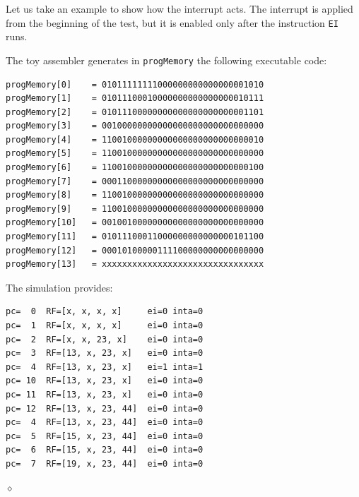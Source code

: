 \begin{exemplu}
Let us take an example to show how the interrupt acts. The interrupt is applied from the beginning of the test, but it is enabled only after the instruction {\tt EI} runs.
{\em 
{}
}

The toy assembler generates in {\tt progMemory} the following executable code:

{\small
\begin{verbatim}
progMemory[0]    = 01011111111000000000000000001010
progMemory[1]    = 01011100010000000000000000010111
progMemory[2]    = 01011100000000000000000000001101
progMemory[3]    = 00100000000000000000000000000000
progMemory[4]    = 11001000000000000000000000000010
progMemory[5]    = 11001000000000000000000000000000
progMemory[6]    = 11001000000000000000000000000100
progMemory[7]    = 00011000000000000000000000000000
progMemory[8]    = 11001000000000000000000000000000
progMemory[9]    = 11001000000000000000000000000000
progMemory[10] 	 = 00100100000000000000000000000000
progMemory[11] 	 = 01011100011000000000000000101100
progMemory[12] 	 = 00010100000111100000000000000000
progMemory[13] 	 = xxxxxxxxxxxxxxxxxxxxxxxxxxxxxxxx
\end{verbatim}
}
The simulation provides:
{\small
\begin{verbatim}
pc=  0  RF=[x, x, x, x]     ei=0 inta=0
pc=  1  RF=[x, x, x, x]     ei=0 inta=0
pc=  2  RF=[x, x, 23, x]    ei=0 inta=0
pc=  3  RF=[13, x, 23, x]   ei=0 inta=0
pc=  4  RF=[13, x, 23, x]   ei=1 inta=1
pc= 10  RF=[13, x, 23, x]   ei=0 inta=0
pc= 11  RF=[13, x, 23, x]   ei=0 inta=0
pc= 12  RF=[13, x, 23, 44]  ei=0 inta=0
pc=  4  RF=[13, x, 23, 44]  ei=0 inta=0
pc=  5  RF=[15, x, 23, 44]  ei=0 inta=0
pc=  6  RF=[15, x, 23, 44]  ei=0 inta=0
pc=  7  RF=[19, x, 23, 44]  ei=0 inta=0
\end{verbatim}
}

$\diamond$
\end{exemplu}

